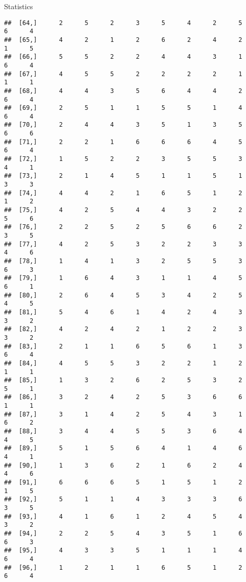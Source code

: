 \documentclass[
  ignorenonframetext,
]{beamer}
\begin{document}
\begin{frame}[fragile]{Statistics}
\begin{verbatim}
##  [64,]      2      5      2      3      5      4      2      5      6      4
##  [65,]      4      2      1      2      6      2      4      2      1      5
##  [66,]      5      5      2      2      4      4      3      1      6      4
##  [67,]      4      5      5      2      2      2      2      1      1      1
##  [68,]      4      4      3      5      6      4      4      2      6      4
##  [69,]      2      5      1      1      5      5      1      4      6      4
##  [70,]      2      4      4      3      5      1      3      5      6      6
##  [71,]      2      2      1      6      6      6      4      5      6      4
##  [72,]      1      5      2      2      3      5      5      3      4      1
##  [73,]      2      1      4      5      1      1      5      1      3      3
##  [74,]      4      4      2      1      6      5      1      2      1      2
##  [75,]      4      2      5      4      4      3      2      2      5      6
##  [76,]      2      2      5      2      5      6      6      2      3      5
##  [77,]      4      2      5      3      2      2      3      3      4      6
##  [78,]      1      4      1      3      2      5      5      3      6      3
##  [79,]      1      6      4      3      1      1      4      5      6      1
##  [80,]      2      6      4      5      3      4      2      5      4      5
##  [81,]      5      4      6      1      4      2      4      3      3      2
##  [82,]      4      2      4      2      1      2      2      3      3      2
##  [83,]      2      1      1      6      5      6      1      3      6      4
##  [84,]      4      5      5      3      2      2      1      2      1      1
##  [85,]      1      3      2      6      2      5      3      2      5      1
##  [86,]      3      2      4      2      5      3      6      6      1      1
##  [87,]      3      1      4      2      5      4      3      1      6      2
##  [88,]      3      4      4      5      5      3      6      4      4      5
##  [89,]      5      1      5      6      4      1      4      6      4      1
##  [90,]      1      3      6      2      1      6      2      4      4      6
##  [91,]      6      6      6      5      1      5      1      2      1      5
##  [92,]      5      1      1      4      3      3      3      6      3      5
##  [93,]      4      1      6      1      2      4      5      4      3      2
##  [94,]      2      2      5      4      3      5      1      6      6      3
##  [95,]      4      3      3      5      1      1      1      4      6      4
##  [96,]      1      2      1      1      6      5      1      2      6      4

\end{verbatim}
\end{frame}
\end{document}

